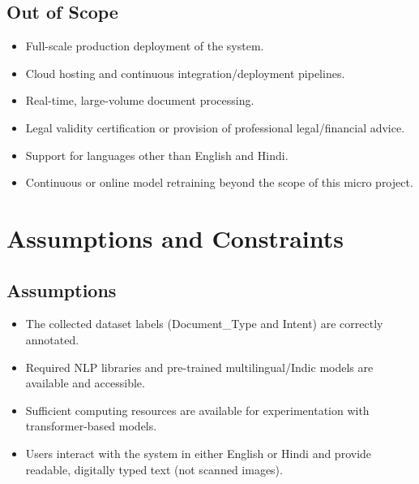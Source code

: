 
\subsection{Out of Scope}

\begin{itemize}
    \item Full-scale production deployment of the system.
    \item Cloud hosting and continuous integration/deployment pipelines.
    \item Real-time, large-volume document processing.
    \item Legal validity certification or provision of professional legal/financial advice.
    \item Support for languages other than English and Hindi.
    \item Continuous or online model retraining beyond the scope of this micro project.
\end{itemize}


\section{Assumptions and Constraints}


\subsection*{Assumptions}

\begin{itemize}
    \item The collected dataset labels (Document\_Type and Intent) are correctly annotated.
    \item Required NLP libraries and pre-trained multilingual/Indic models are available and accessible.
    \item Sufficient computing resources are available for experimentation with transformer-based models.
    \item Users interact with the system in either English or Hindi and provide readable, digitally typed text (not scanned images).
\end{itemize}


